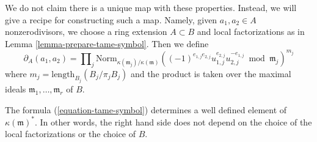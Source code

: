 \medskip\noindent
We do not claim there is a unique map with these properties.
Instead, we will give a recipe for constructing such a map.
Namely, given $a_1, a_2 \in A$ nonzerodivisors, we choose
a ring extension $A \subset B$ and local factorizations
as in Lemma \ref{lemma-prepare-tame-symbol}.
Then we define
\begin{equation}
\label{equation-tame-symbol}
\partial_A(a_1, a_2) = \prod\nolimits_j
\text{Norm}_{\kappa(\mathfrak m_j)/\kappa(\mathfrak m)}
((-1)^{e_{1, j}e_{2, j}}u_{1, j}^{e_{2, j}}u_{2, j}^{-e_{1, j}}
\bmod \mathfrak m_j)^{m_j}
\end{equation}
where $m_j = \text{length}_{B_j}(B_j/\pi_j B_j)$ and the product
is taken over the maximal ideals $\mathfrak m_1, \ldots, \mathfrak m_r$ of $B$.

\begin{lemma}
\label{lemma-well-defined-tame-symbol}
The formula (\ref{equation-tame-symbol}) determines a
well defined element of $\kappa(\mathfrak m)^*$. In other words, the
right hand side does not depend on the choice of the
local factorizations or the choice of $B$.
\end{lemma}

